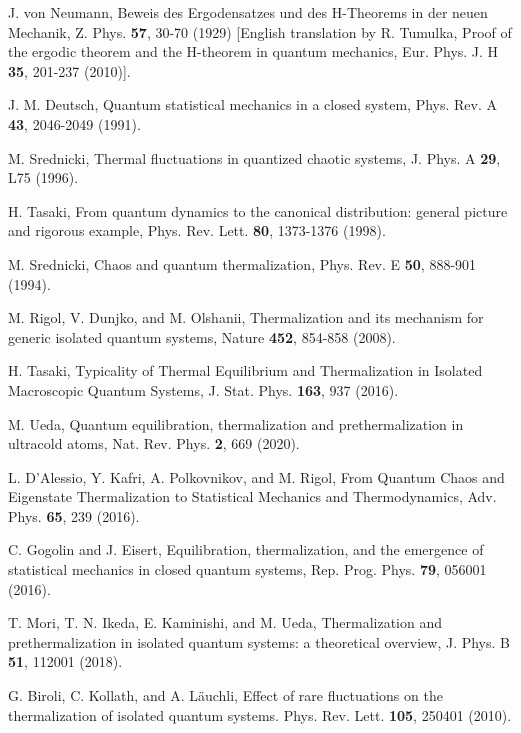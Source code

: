 \documentclass[twocolumn,aps,prb,floatfix,superscriptaddress]{revtex4-2}
\newcommand{\<}{\left\langle}	%
\renewcommand{\>}{\right\rangle}	%
\begin{document}
\begin{thebibliography}{70}

J. von Neumann,
Beweis des Ergodensatzes und des H-Theorems in der neuen Mechanik,
Z. Phys. {\bf 57}, 30-70 (1929)
[English translation by R. Tumulka,
Proof of the ergodic theorem and the H-theorem in quantum mechanics,
Eur. Phys. J. H {\bf 35}, 201-237 (2010)].

J. M. Deutsch, 
Quantum statistical mechanics in a closed system,
Phys. Rev. A {\bf 43}, 2046-2049 (1991).

M. Srednicki, 
Thermal fluctuations in quantized chaotic systems, 
J. Phys. A {\bf 29}, L75 (1996).

H. Tasaki, 
From quantum dynamics to the canonical distribution:
general picture and rigorous example,
Phys. Rev. Lett. {\bf 80}, 1373-1376 (1998).

M. Srednicki, 
Chaos and quantum thermalization,
Phys. Rev. E {\bf 50}, 888-901 (1994).

M. Rigol, V. Dunjko, and M. Olshanii,
Thermalization and its mechanism for generic
isolated quantum systems,
Nature {\bf 452}, 854-858 (2008).

H. Tasaki,
Typicality of Thermal Equilibrium and Thermalization 
in Isolated Macroscopic Quantum Systems,
J. Stat. Phys. {\bf 163}, 937 (2016).

M. Ueda,
Quantum equilibration, thermalization and prethermalization in ultracold atoms, 
Nat. Rev. Phys. {\bf 2}, 669 (2020).

L. D'Alessio, Y. Kafri, A. Polkovnikov, and M. Rigol,
From Quantum Chaos and Eigenstate Thermalization
to Statistical Mechanics and Thermodynamics,
Adv. Phys.  {\bf 65}, 239 (2016).

C. Gogolin and J. Eisert,
Equilibration, thermalization, and the emergence
of statistical mechanics in closed quantum systems,
Rep. Prog. Phys. {\bf 79}, 056001 (2016).

T. Mori, T. N. Ikeda, E. Kaminishi, and M. Ueda,
Thermalization and prethermalization 
in isolated quantum systems: a theoretical overview,
J. Phys. B  {\bf 51}, 112001 (2018).

G. Biroli, C. Kollath, and A. L\"auchli,
Effect of rare fluctuations on the thermalization of isolated quantum systems.
Phys. Rev. Lett. {\bf 105}, 250401 (2010).


\end{thebibliography}
\end{document}
